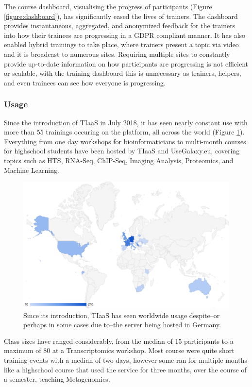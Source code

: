 \documentclass[a4paper,num-refs]{oup-contemporary}
\begin{document}
The course dashboard, visualising the progress of participants (Figure \ref{figure:dashboard}), has significantly eased the lives of trainers. The dashboard provides instantaneous, aggregated, and anonymized feedback for the trainers into how their trainees are progressing in a GDPR compliant manner. It has also enabled hybrid trainings to take place, where trainers present a topic via video and it is broadcast to numerous sites. Requiring multiple sites to constantly provide up-to-date information on how participants are progressing is not efficient or scalable, with the training dashboard this is unnecessary as trainers, helpers, and even trainees can see how everyone is progressing.

\subsubsection{Usage}
Since the introduction of TIaaS in July 2018, it has seen nearly constant use with more than 55 trainings occuring on the platform, all across the world (Figure \ref{figure:map}). Everything from one day workshops for bioinformaticians to multi-month courses for highschool students have been hosted by TIaaS and UseGalaxy.eu, covering topics such as HTS, RNA-Seq, ChIP-Seq, Imaging Analysis, Proteomics, and Machine Learning.

\begin{figure}[bt!]
\centering
\includegraphics[width=\linewidth]{images/map.png}
	\caption{Since its introduction, TIaaS has seen worldwide usage despite--or perhaps in some cases due to--the server being hosted in Germany.}\label{figure:map}
\end{figure}

Class sizes have ranged considerably, from the median of 15 participants to a maximum of 80 at a Transcriptomics workshop. Most course were quite short training events with a median of two days, however some ran for multiple months like a highschool course that used the service for three months, over the course of a semester, teaching Metagenomics.
\end{document}
